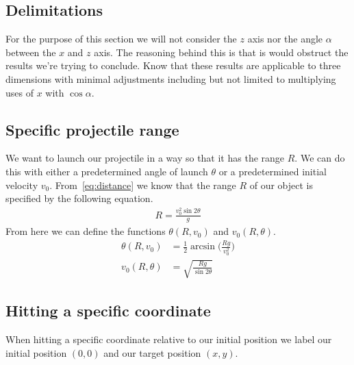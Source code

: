 \documentclass[%
aip,
jmp,
amsmath,amssymb,
reprint,%
]{revtex4-1}
\begin{document}
	\subsection{Delimitations}
	For the purpose of this section we will not consider the $z$ axis nor the angle $\alpha$ between the $x$ and $z$ axis. The reasoning behind this is that is would obstruct the results we're trying to conclude. Know that these results are applicable to three dimensions with minimal adjustments including but not limited to multiplying uses of $x$ with $\cos\alpha$.
	
	\subsection{Specific projectile range}
	We want to launch our projectile in a way so that it has the range $R$. We can do this with either a predetermined angle of launch $\theta$ or a predetermined initial velocity $v_0$. From~\eqref{eq:distance} we know that the range $R$ of our object is specified by the following equation.
	\begin{align}\nonumber
		R = \frac{v_{0}^2\sin2\theta}{g}
	\end{align}
	From here we can define the functions $\theta(R, v_0)$ and $v_0(R, \theta)$.
	\begin{align}\nonumber
		\theta(R, v_0) &= \frac12\arcsin\Big(\frac{Rg}{v_{0}^2}\Big)\\\nonumber
		v_0(R, \theta) &= \sqrt{\frac{Rg}{\sin2\theta}}
	\end{align}
	\subsection{Hitting a specific coordinate}
	When hitting a specific coordinate relative to our initial position we label our initial position $(0, 0)$ and our target position $(x, y)$.
\end{document}
